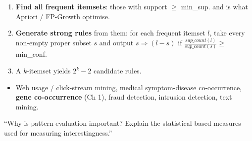 {\begin{enumerate}
  \item \textbf{Find all frequent itemsets}: those with support $\ge$ min\_sup.
         and is what Apriori / FP-Growth optimise.
  \item \textbf{Generate strong rules} from them: for each frequent itemset $l$, take every
        non-empty proper subset $s$ and output $s \Rightarrow (l-s)$ if
        $\frac{sup\_count(l)}{sup\_count(s)} \ge$ min\_conf.
  \item A $k$-itemset yields $2^k - 2$ candidate rules.
\end{enumerate}
\begin{itemize}
  \item Web usage / click-stream mining, medical symptom-disease co-occurrence,
        \textbf{gene co-occurrence} (Ch 1), fraud detection, intrusion detection, text mining.
\end{itemize}}

\vspace{3pt}
{\color{sub}\footnotesize {} \gap ``Why is pattern evaluation important? Explain the
statistical based measures used for measuring interestingness.'' }

